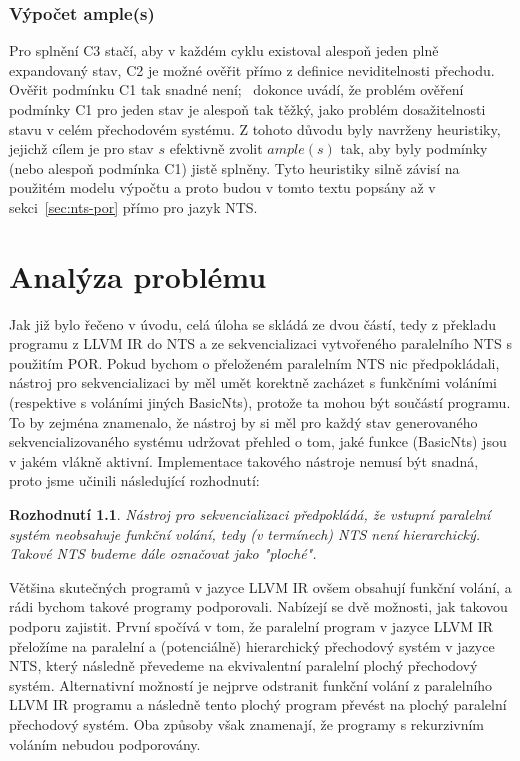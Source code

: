 \documentclass[12pt]{fithesis2}
\newtheorem{decision}  {Rozhodnutí}
\begin{document}
\subsection{Výpočet ample(s)}
\label{subsec:por-compute-ample}
Pro splnění C3 stačí, aby v každém cyklu existoval alespoň jeden plně expandovaný stav, C2 je možné ověřit přímo z definice neviditelnosti přechodu. Ověřit podmínku C1 tak snadné není; \cite{CLARKE}~dokonce uvádí, že problém ověření podmínky C1 pro jeden stav je alespoň tak těžký, jako problém dosažitelnosti stavu v celém přechodovém systému. Z tohoto důvodu byly navrženy heuristiky, jejichž cílem je pro stav $s$ efektivně zvolit $ample(s)$ tak, aby byly podmínky (nebo alespoň podmínka C1) jistě splněny. Tyto heuristiky silně závisí na použitém modelu výpočtu a proto budou v tomto textu popsány až v sekci~\ref{sec:nts-por} přímo pro jazyk NTS.


\chapter{Analýza problému}
\label{sec:analysis}
Jak již bylo řečeno v úvodu, celá úloha se skládá ze dvou částí, tedy z překladu programu z LLVM IR do NTS a  ze sekvencializaci vytvořeného paralelního NTS s použitím POR. Pokud bychom o přeloženém paralelním NTS nic předpokládali, nástroj pro sekvencializaci by měl umět korektně zacházet s funkčními voláními (respektive s voláními jiných BasicNts), protože ta mohou být součástí programu. To by zejména znamenalo, že nástroj by si měl pro každý stav generovaného sekvencializovaného systému udržovat přehled o tom, jaké funkce (BasicNts) jsou v jakém vlákně aktivní. Implementace takového nástroje nemusí být snadná, proto jsme učinili následující rozhodnutí:

\begin{decision}\label{decision:sequentialize-flat-llvm}
Nástroj pro sekvencializaci předpokládá, že vstupní paralelní systém neobsahuje funkční volání, tedy (v termínech) NTS není hierarchický. Takové NTS budeme dále označovat jako "ploché".
\end{decision}

Většina skutečných programů v jazyce LLVM IR ovšem obsahují funkční volání, a rádi bychom takové programy podporovali. Nabízejí se dvě možnosti, jak takovou podporu zajistit. První spočívá v tom, že paralelní program v jazyce LLVM IR přeložíme na paralelní a (potenciálně) hierarchický přechodový systém v jazyce NTS, který následně převedeme na ekvivalentní paralelní plochý přechodový systém. Alternativní možností je nejprve odstranit funkční volání z paralelního LLVM IR programu a následně tento plochý program převést na plochý paralelní přechodový systém. Oba způsoby však znamenají, že programy s rekurzivním voláním nebudou podporovány.
\end{document}

